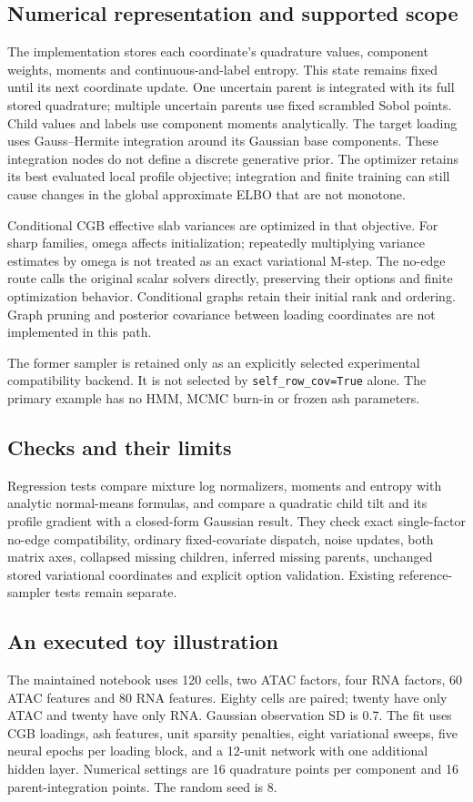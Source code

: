 \documentclass[11pt,a4paper]{article}
\begin{document}
\subsection{Numerical representation and supported scope}
The implementation stores each coordinate's quadrature values, component
weights, moments and continuous-and-label entropy. This state remains fixed
until its next coordinate update. One uncertain parent is integrated with
its full stored quadrature; multiple uncertain parents use fixed scrambled
Sobol points. Child values and labels use component moments analytically.
The target loading uses Gauss--Hermite integration around its Gaussian base
components. These integration nodes do not define a discrete generative
prior. The optimizer retains its best evaluated local profile objective;
integration and finite training can still cause changes in the global
approximate ELBO that are not monotone.

Conditional CGB effective slab variances are optimized in that objective.
For sharp families, omega affects initialization; repeatedly multiplying
variance estimates by omega is not treated as an exact variational M-step.
The no-edge route calls the original scalar solvers directly, preserving
their options and finite optimization behavior. Conditional graphs retain
their initial rank and ordering. Graph pruning and posterior covariance
between loading coordinates are not implemented in this path.

The former sampler is retained only as an explicitly selected experimental
compatibility backend. It is not selected by \texttt{self\_row\_cov=True}
alone. The primary example has no HMM, MCMC burn-in or frozen ash parameters.

\subsection{Checks and their limits}
Regression tests compare mixture log normalizers, moments and entropy with
analytic normal-means formulas, and compare a quadratic child tilt and its
profile gradient with a closed-form Gaussian result. They check exact
single-factor no-edge compatibility, ordinary fixed-covariate dispatch,
noise updates, both matrix axes, collapsed missing children, inferred missing
parents, unchanged stored variational coordinates and explicit option
validation. Existing reference-sampler tests remain separate.

\clearpage
\subsection{An executed toy illustration}
The maintained notebook uses 120 cells, two ATAC factors, four RNA factors,
60 ATAC features and 80 RNA features. Eighty cells are paired; twenty have
only ATAC and twenty have only RNA. Gaussian observation SD is 0.7. The fit
uses CGB loadings, ash features, unit sparsity penalties, eight variational
sweeps, five neural epochs per loading block, and a 12-unit network with
one additional hidden layer. Numerical settings are 16 quadrature points
per component and 16 parent-integration points. The random seed is 8.
\end{document}
